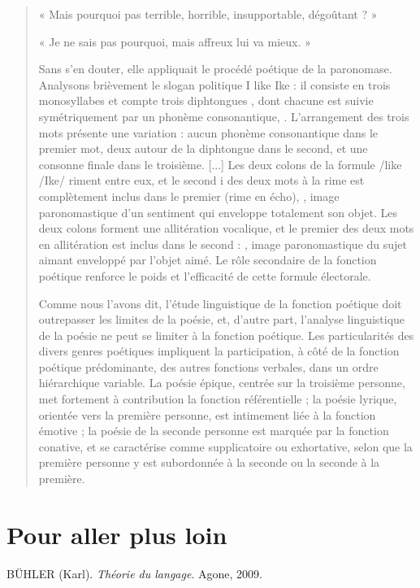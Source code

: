 \begin{quote}
« Mais pourquoi pas terrible, horrible, insupportable, dégoûtant ? »

« Je ne sais pas pourquoi, mais affreux lui va mieux. »

Sans s’en douter, elle appliquait le procédé poétique de la paronomase. Analysons brièvement le slogan politique I like Ike : il consiste en trois monosyllabes et compte trois diphtongues , dont chacune est suivie symétriquement par un phonème consonantique, . L’arrangement des trois mots présente une variation : aucun phonème consonantique dans le premier mot, deux autour de la diphtongue dans le second, et une consonne finale dans le troisième. [...] Les deux colons de la formule /like /Ike/ riment entre eux, et le second i des deux mots à la rime est complètement inclus dans le premier (rime en écho), , image paronomastique d’un sentiment qui enveloppe totalement son objet. Les deux colons forment une allitération vocalique, et le premier des deux mots en allitération est inclus dans le second : , image paronomastique du sujet aimant enveloppé par l’objet aimé. Le rôle secondaire de la fonction poétique renforce le poids et l’efficacité de cette formule électorale.

Comme nous l’avons dit, l’étude linguistique de la fonction poétique doit outrepasser les limites de la poésie, et, d’autre part, l’analyse linguistique de la poésie ne peut se limiter à la fonction poétique. Les particularités des divers genres poétiques impliquent la participation, à côté de la fonction poétique prédominante, des autres fonctions verbales, dans un ordre hiérarchique variable. La poésie épique, centrée sur la troisième personne, met fortement à contribution la fonction référentielle ; la poésie lyrique, orientée vers la première personne, est intimement liée à la fonction émotive ; la poésie de la seconde personne est marquée par la fonction conative, et se caractérise comme supplicatoire ou exhortative, selon que la première personne y est subordonnée à la seconde ou la seconde à la première.
\end{quote}

\section*{Pour aller plus loin}
\label{reading-8}
\begingroup\small\setlength{\parindent}{0pt}
BÜHLER (Karl). \textit{Théorie du langage}. Agone, 2009.

